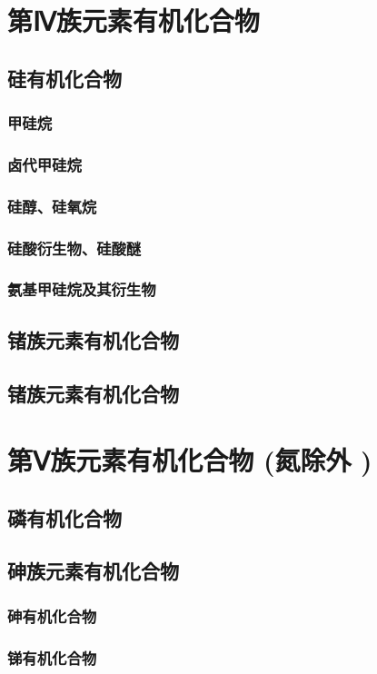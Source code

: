 \documentclass[UTF8]{../03-Chemistry}
\begin{document}
\section{第Ⅳ族元素有机化合物}
    \subsection{硅有机化合物}
        \subsubsection{甲硅烷}
        \subsubsection{卤代甲硅烷}
        \subsubsection{硅醇、硅氧烷}
        \subsubsection{硅酸衍生物、硅酸醚}
        \subsubsection{氨基甲硅烷及其衍生物}
    \subsection{锗族元素有机化合物}
    \subsection{锗族元素有机化合物}
\section{第Ⅴ族元素有机化合物 (氮除外 )}
    \subsection{磷有机化合物}
    \subsection{砷族元素有机化合物}
        \subsubsection{砷有机化合物}
        \subsubsection{锑有机化合物}
\end{document}
